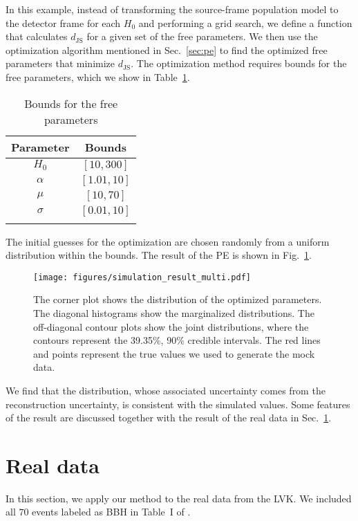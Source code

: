 \documentclass[sn-aps, pdflatex]{sn-jnl}
\begin{document}
In this example, instead of transforming the source-frame population model to the detector frame for each $H_0$ and performing a grid search, we define a function that calculates $d_\mathrm{JS}$ for a given set of the free parameters.
We then use the optimization algorithm mentioned in Sec.~\ref{sec:pe} to find the optimized free parameters that minimize $d_\mathrm{JS}$.
The optimization method requires bounds for the free parameters, which we show in Table~\ref{tab:bounds}.
\begin{table}[htbp]
    \caption{Bounds for the free parameters}
    \begin{tabular}{cc}
        \toprule
        Parameter & Bounds \\
        \midrule
        $H_0$ & $[10, 300]$ \\
        $\alpha$ & $[1.01, 10]$ \\
        $\mu$ & $[10, 70]$ \\
        $\sigma$ & $[0.01, 10]$ \\
        \botrule
    \end{tabular}
    \label{tab:bounds}
\end{table}
The initial guesses for the optimization are chosen randomly from a uniform distribution within the bounds.
The result of the \ac{PE} is shown in Fig.~\ref{fig:simulation_result_multi}.
\begin{figure}[htbp]
    \texttt{[image: figures/simulation\_result\_multi.pdf]}
    \caption{
        The corner plot shows the distribution of the optimized parameters.
        The diagonal histograms show the marginalized distributions.
        The off-diagonal contour plots show the joint distributions, where the contours represent the 39.35\%, 90\% credible intervals.
        The red lines and points represent the true values we used to generate the mock data.
    }
    \label{fig:simulation_result_multi}
\end{figure}
We find that the distribution, whose associated uncertainty comes from the reconstruction uncertainty, is consistent with the simulated values.
Some features of the result are discussed together with the result of the real data in Sec.~\ref{sec:real_data}.

\section{Real data}
\label{sec:real_data}

In this section, we apply our method to the real data from the \ac{LVK}.
We included all $70$ events labeled as BBH in Table~I of \cite{KAGRA:2021duu}.
\end{document}
